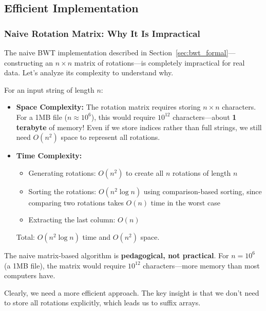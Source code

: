 \subsection{Efficient Implementation}
\label{sec:bwt_efficient}

\subsubsection{Naive Rotation Matrix: Why It Is Impractical}

The naive BWT implementation described in Section~\ref{sec:bwt_formal}—constructing an \(n \times n\) matrix of rotations—is completely impractical for real data. Let's analyze its complexity to understand why.

\begin{importantbox}

For an input string of length \(n\):

\begin{itemize}
    \item \textbf{Space Complexity:} The rotation matrix requires storing \(n \times n\) characters. For a 1MB file (\(n \approx 10^6\)), this would require \(10^{12}\) characters—about \textbf{1 terabyte} of memory! Even if we store indices rather than full strings, we still need \(O(n^2)\) space to represent all rotations.

    \item \textbf{Time Complexity:} 
    \begin{itemize}
        \item Generating rotations: \(O(n^2)\) to create all \(n\) rotations of length \(n\)
        \item Sorting the rotations: \(O(n^2 \log n)\) using comparison-based sorting, since comparing two rotations takes \(O(n)\) time in the worst case
        \item Extracting the last column: \(O(n)\)
    \end{itemize}
    Total: \(O(n^2 \log n)\) time and \(O(n^2)\) space.
\end{itemize}

The naive matrix-based algorithm is \textbf{pedagogical, not practical}. For \(n = 10^6\) (a 1MB file), the matrix would require \(10^{12}\) characters—more memory than most computers have.

\end{importantbox}

Clearly, we need a more efficient approach. The key insight is that we don't need to store all rotations explicitly, which leads us to suffix arrays.

